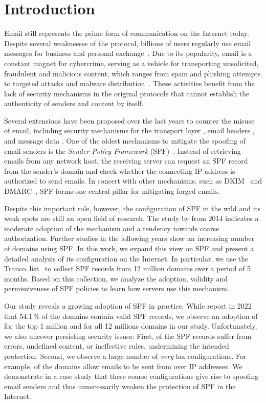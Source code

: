 \section{Introduction}

Email still represents the prime form of communication on the Internet today.
Despite several weaknesses of the protocol, billions of users regularly use email messages for business and personal exchange~\citep{emailUsersWorld}.
Due to its popularity, email is a constant magnet for cybercrime, serving as a vehicle for transporting unsolicited, fraudulent and malicious content, which ranges from spam and phishing attempts to targeted attacks and malware distribution~\mbox{\citep[e.g.,][]{ SimZanThoBur+20, KanKreLevEnr+08, 
HuWan18, GasUllStrRie+18}}.
These activities benefit from the lack of security mechanisms in the original protocols that cannot establish the authenticity of senders and content by itself.

Several extensions have been proposed over the last years to counter the misuse of email, including security mechanisms for the transport layer \citep{rfc3207, rfc2595}, email headers \citep{rfc6376}, and message data \citep{rfc8551, rfc3156}.
One of the oldest mechanisms to mitigate the spoofing of email senders is the \emph{Sender Policy Framework} (SPF)~\citep{rfc7208}.
Instead of retrieving emails from any network host, the receiving server can request an SPF record from the sender's domain and check whether the connecting IP address is authorized to send emails.
In concert with other mechanisms, such as DKIM~\citep{rfc6376} and DMARC~\citep{rfc7489}, SPF forms one central pillar for mitigating forged emails.

Despite this important role, however, the configuration of SPF in the wild and its weak spots are still an open field of research.
The study by \citet{Gojmerac2015} from 2014 indicates a moderate adoption of the mechanism and a tendency towards coarse authorization.
Further studies in the following years show an increasing number of domains using SPF.
In this work, we expand this view on SPF and present a detailed analysis of its configuration on the Internet.
In particular, we use the \mbox{Tranco list \citep{TrancoList}} to collect SPF records from 12 million domains over a period of 5 months.
Based on this collection, we analyze the adoption, validity and permissiveness of SPF policies to learn how servers use this mechanism.

Our study reveals a growing adoption of SPF in practice.
While \citeauthor{Wang2022} report in 2022 that 54.1\,\% of the domains contain valid SPF records, we observe an adoption of \SPFDomainsMPerc for the top 1 million and \SPFDomainsPerc for all 12 millions domains in our study.
Unfortunately, we also uncover persisting security issues: First, \ErrorDomainsPerc of the SPF records suffer from errors, undefined content, or ineffective rules, undermining the intended protection.
Second, we observe a large number of \emph{very} lax configurations.
For example, \HugeDomainsPerc of the domains allow emails to be sent from over  IP addresses.
We demonstrate in a case study that these coarse configurations give rise to spoofing email senders and thus unnecessarily weaken the protection of SPF in the Internet.

